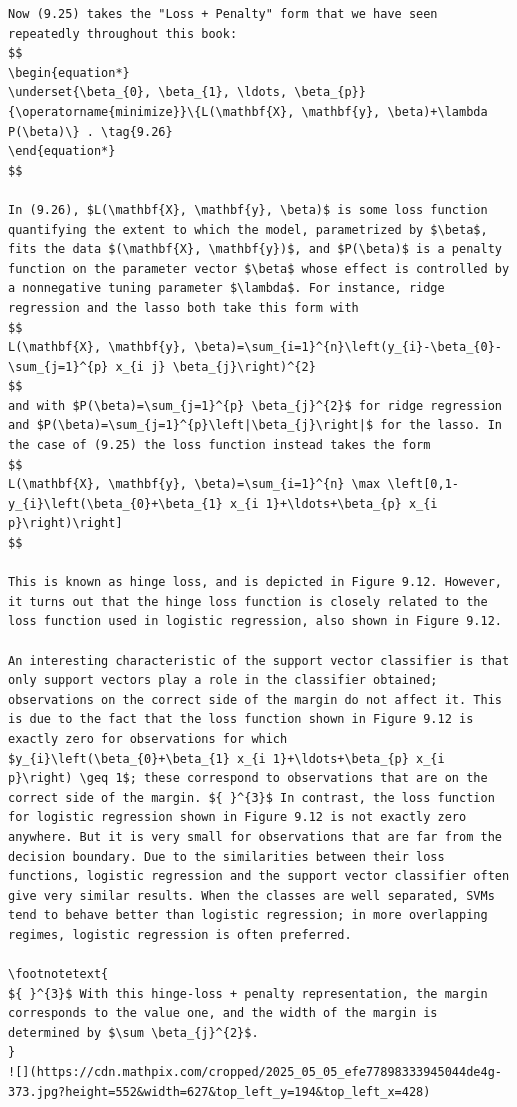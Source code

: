 \documentclass[10pt]{article}
\let\svthefootnote\thefootnote
\newcommand\blfootnotetext[1]{%
  \let\thefootnote\relax\footnote{#1}%
  \addtocounter{footnote}{-1}%
  \let\thefootnote\svthefootnote%
}
\let\svfootnotetext\footnotetext
\renewcommand\footnotetext[2][?]{%
  \if\relax#1\relax%
    \ifnum\value{footnote}=0\blfootnotetext{#2}\else\svfootnotetext{#2}\fi%
  \else%
    \if?#1\ifnum\value{footnote}=0\blfootnotetext{#2}\else\svfootnotetext{#2}\fi%
    \else\svfootnotetext[#1]{#2}\fi%
  \fi
}
\begin{document}
\begin{verbatim}
Now (9.25) takes the "Loss + Penalty" form that we have seen repeatedly throughout this book:
$$
\begin{equation*}
\underset{\beta_{0}, \beta_{1}, \ldots, \beta_{p}}{\operatorname{minimize}}\{L(\mathbf{X}, \mathbf{y}, \beta)+\lambda P(\beta)\} . \tag{9.26}
\end{equation*}
$$

In (9.26), $L(\mathbf{X}, \mathbf{y}, \beta)$ is some loss function quantifying the extent to which the model, parametrized by $\beta$, fits the data $(\mathbf{X}, \mathbf{y})$, and $P(\beta)$ is a penalty function on the parameter vector $\beta$ whose effect is controlled by a nonnegative tuning parameter $\lambda$. For instance, ridge regression and the lasso both take this form with
$$
L(\mathbf{X}, \mathbf{y}, \beta)=\sum_{i=1}^{n}\left(y_{i}-\beta_{0}-\sum_{j=1}^{p} x_{i j} \beta_{j}\right)^{2}
$$
and with $P(\beta)=\sum_{j=1}^{p} \beta_{j}^{2}$ for ridge regression and $P(\beta)=\sum_{j=1}^{p}\left|\beta_{j}\right|$ for the lasso. In the case of (9.25) the loss function instead takes the form
$$
L(\mathbf{X}, \mathbf{y}, \beta)=\sum_{i=1}^{n} \max \left[0,1-y_{i}\left(\beta_{0}+\beta_{1} x_{i 1}+\ldots+\beta_{p} x_{i p}\right)\right]
$$

This is known as hinge loss, and is depicted in Figure 9.12. However, it turns out that the hinge loss function is closely related to the loss function used in logistic regression, also shown in Figure 9.12.

An interesting characteristic of the support vector classifier is that only support vectors play a role in the classifier obtained; observations on the correct side of the margin do not affect it. This is due to the fact that the loss function shown in Figure 9.12 is exactly zero for observations for which $y_{i}\left(\beta_{0}+\beta_{1} x_{i 1}+\ldots+\beta_{p} x_{i p}\right) \geq 1$; these correspond to observations that are on the correct side of the margin. ${ }^{3}$ In contrast, the loss function for logistic regression shown in Figure 9.12 is not exactly zero anywhere. But it is very small for observations that are far from the decision boundary. Due to the similarities between their loss functions, logistic regression and the support vector classifier often give very similar results. When the classes are well separated, SVMs tend to behave better than logistic regression; in more overlapping regimes, logistic regression is often preferred.

\footnotetext{
${ }^{3}$ With this hinge-loss + penalty representation, the margin corresponds to the value one, and the width of the margin is determined by $\sum \beta_{j}^{2}$.
}
![](https://cdn.mathpix.com/cropped/2025_05_05_efe77898333945044de4g-373.jpg?height=552&width=627&top_left_y=194&top_left_x=428)


\end{verbatim}
\end{document}
